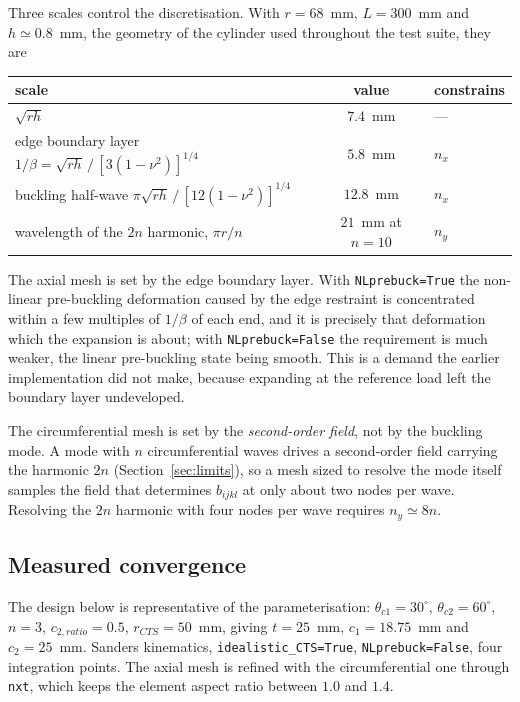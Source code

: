 \documentclass[11pt,a4paper]{article}
\begin{document}
Three scales control the discretisation.  With $r = 68$~mm, $L = 300$~mm and
$h \simeq 0.8$~mm, the geometry of the cylinder used throughout the test
suite, they are

\begin{center}
\begin{tabular}{lcl}
\toprule
scale & value & constrains \\
\midrule
$\sqrt{rh}$ & $7.4$~mm & --- \\
edge boundary layer $1/\beta = \sqrt{rh}\,\big/\,[3(1-\nu^2)]^{1/4}$
    & $5.8$~mm & $n_x$ \\
buckling half-wave $\pi\sqrt{rh}\,\big/\,[12(1-\nu^2)]^{1/4}$
    & $12.8$~mm & $n_x$ \\
wavelength of the $2n$ harmonic, $\pi r/n$ & $21$~mm at $n{=}10$ & $n_y$ \\
\bottomrule
\end{tabular}
\end{center}

The axial mesh is set by the edge boundary layer.  With
\texttt{NLprebuck=True} the non-linear pre-buckling deformation caused by the
edge restraint is concentrated within a few multiples of $1/\beta$ of each
end, and it is precisely that deformation which the expansion is about; with
\texttt{NLprebuck=False} the requirement is much weaker, the linear
pre-buckling state being smooth.  This is a demand the earlier
implementation did not make, because expanding at the reference load left the
boundary layer undeveloped.

The circumferential mesh is set by the \emph{second-order field}, not by the
buckling mode.  A mode with $n$ circumferential waves drives a second-order
field carrying the harmonic $2n$ (Section~\ref{sec:limits}), so a mesh sized
to resolve the mode itself samples the field that determines $b_{ijkl}$ at
only about two nodes per wave.  Resolving the $2n$ harmonic with four nodes
per wave requires $n_y \simeq 8n$.

\subsection{Measured convergence}
\label{sec:cts-convergence}

The design below is representative of the parameterisation: $\theta_{c1} =
30^\circ$, $\theta_{c2} = 60^\circ$, $n = 3$, $c_{2,ratio} = 0.5$, $r_{CTS} =
50$~mm, giving $t = 25$~mm, $c_1 = 18.75$~mm and $c_2 = 25$~mm.  Sanders
kinematics, \texttt{idealistic\_CTS=True}, \texttt{NLprebuck=False}, four
integration points.  The axial mesh is refined with the circumferential one
through \texttt{nxt}, which keeps the element aspect ratio between $1.0$ and
$1.4$.
\end{document}
